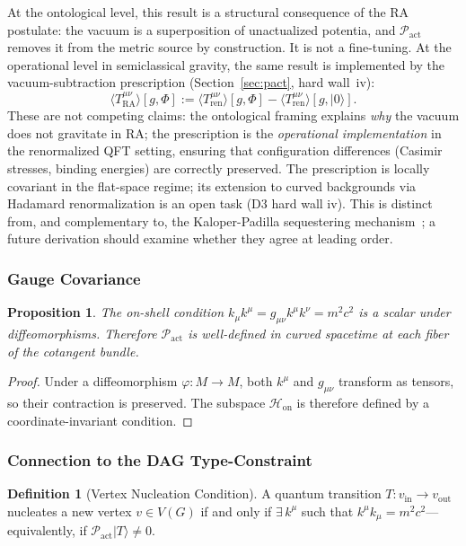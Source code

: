 \documentclass[11pt,a4paper]{article}
\theoremstyle{plain}
\newtheorem{proposition}[theorem]{Proposition}
\theoremstyle{definition}
\newtheorem{definition}[theorem]{Definition}
\theoremstyle{remark}
\newcommand{\Pact}{\mathcal{P}_{\mathrm{act}}}
\newcommand{\Hon}{\mathcal{H}_{\mathrm{on}}}
\newcommand{\Tact}{T^{\mu\nu}_{\mathrm{RA}}}
\newcommand{\ket}[1]{|#1\rangle}
\begin{document}
At the ontological level, this result is a structural consequence of the RA
postulate: the vacuum is a superposition of unactualized potentia, and $\Pact$
removes it from the metric source by construction. It is not a fine-tuning.
At the operational level in semiclassical gravity, the same result is implemented
by the vacuum-subtraction prescription (Section~\ref{sec:pact}, hard wall~iv):
\begin{equation*}
  \langle\Tact\rangle[g,\Phi]
  := \langle T^{\mu\nu}_{\mathrm{ren}}\rangle[g,\Phi]
   - \langle T^{\mu\nu}_{\mathrm{ren}}\rangle[g,\ket{0}].
\end{equation*}
These are not competing claims: the ontological framing explains \emph{why} the
vacuum does not gravitate in RA; the prescription is the \emph{operational
implementation} in the renormalized QFT setting, ensuring that configuration
differences (Casimir stresses, binding energies) are correctly preserved.
The prescription is locally covariant in the flat-space regime; its extension
to curved backgrounds via Hadamard renormalization is an open task (D3 hard wall iv).
This is distinct from, and complementary to, the Kaloper-Padilla sequestering
mechanism~\citep{KaloperPadilla2014}; a future derivation should examine whether
they agree at leading order.

\subsubsection{Gauge Covariance}

\begin{proposition}
The on-shell condition $k_{\mu}k^{\mu} = g_{\mu\nu}k^{\mu}k^{\nu} = m^{2}c^{2}$
is a scalar under diffeomorphisms. Therefore $\Pact$ is well-defined in curved
spacetime at each fiber of the cotangent bundle.
\end{proposition}
\begin{proof}
Under a diffeomorphism $\varphi: M \to M$, both $k^{\mu}$ and $g_{\mu\nu}$
transform as tensors, so their contraction is preserved. The subspace $\Hon$ is
therefore defined by a coordinate-invariant condition.
\end{proof}

\subsubsection{Connection to the DAG Type-Constraint}

\begin{definition}[Vertex Nucleation Condition]
A quantum transition $T: v_{\mathrm{in}} \to v_{\mathrm{out}}$ nucleates a new
vertex $v \in V(G)$ if and only if $\exists\,k^{\mu}$ such that $k^{\mu}k_{\mu} =
m^{2}c^{2}$---equivalently, if $\Pact\ket{T} \neq 0$.
\end{definition}
\end{document}
